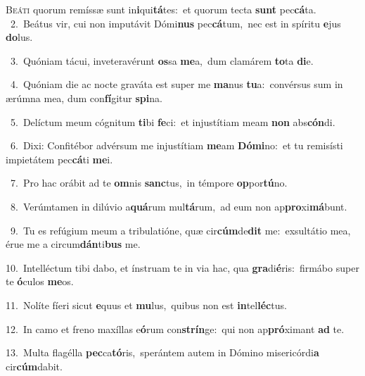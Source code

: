 \lettrine{\initial\textcolor{\initialcolor}{B}}{eáti} quorum remíssæ sunt in\-\textbf{i}\-qui\-\textbf{tá}\-tes:~\star et quorum tecta \textbf{sunt} pec\-\textbf{cá}\-ta.\\
{\numbfont\textcolor{\numbcolor}{~2.}}~Beátus vir, cui non imputávit Dómi\textbf{nus} pec\-\textbf{cá}\-tum,~\star nec est in spíritu \textbf{e}\-jus \textbf{do}\-lus.\par
{\numbfont\textcolor{\numbcolor}{~3.}}~Quóniam tácui, inveteravérunt \textbf{os}\-sa \textbf{me}\-a,~\star dum clamárem \textbf{to}\-ta \textbf{di}\-e.\par
{\numbfont\textcolor{\numbcolor}{~4.}}~Quóniam die ac nocte graváta est super me \textbf{ma}\-nus \textbf{tu}\-a:~\star convérsus sum in ærúmna mea, dum con\-\textbf{fí}\-gitur \textbf{spi}\-na.\par
{\numbfont\textcolor{\numbcolor}{~5.}}~Delíctum meum cógnitum \textbf{ti}\-bi \textbf{fe}\-ci:~\star et injustítiam meam \textbf{non} abs\-\textbf{cón}\-di.\par
{\numbfont\textcolor{\numbcolor}{~6.}}~Dixi: Confitébor advérsum me injustítiam \textbf{me}\-am \textbf{Dó}\-\textbf{mi}no:~\star et tu remisísti impietátem pec\-\textbf{cá}\-ti \textbf{me}\-i.\par
{\numbfont\textcolor{\numbcolor}{~7.}}~Pro hac orábit ad te \textbf{om}\-nis \textbf{sanc}\-tus,~\star in témpore \textbf{op}\-por\-\textbf{tú}\-no.\par
{\numbfont\textcolor{\numbcolor}{~8.}}~Verúmtamen in dilúvio a\-\textbf{quá}\-rum mul\-\textbf{tá}\-rum,~\star ad eum non ap\-\textbf{pro}\-xi\-\textbf{má}\-bunt.\par
{\numbfont\textcolor{\numbcolor}{~9.}}~Tu es refúgium meum a tribulatióne, quæ cir\-\textbf{cúm}\-de\textbf{dit} me:~\star exsultátio mea, érue me a circum\-\textbf{dán}\-ti\textbf{bus} me.\par
{\numbfont\textcolor{\numbcolor}{10.}}~Intelléctum tibi dabo, et ínstruam te in via hac, qua \textbf{gra}\-di\-\textbf{é}\-ris:~\star firmábo super te \textbf{ó}\-culos \textbf{me}\-os.\par
{\numbfont\textcolor{\numbcolor}{11.}}~Nolíte fíeri sicut \textbf{e}\-quus et \textbf{mu}\-lus,~\star quibus non est \textbf{in}\-tel\-\textbf{léc}\-tus.\par
{\numbfont\textcolor{\numbcolor}{12.}}~In camo et freno maxíllas e\-\textbf{ó}\-rum con\-\textbf{strín}\-ge:~\star qui non ap\-\textbf{pró}\-ximant \textbf{ad} te.\par
{\numbfont\textcolor{\numbcolor}{13.}}~Multa flagélla \textbf{pec}\-ca\-\textbf{tó}\-ris,~\star sperántem autem in Dómino misericórdi\textbf{a} cir\-\textbf{cúm}\-dabit.\par
